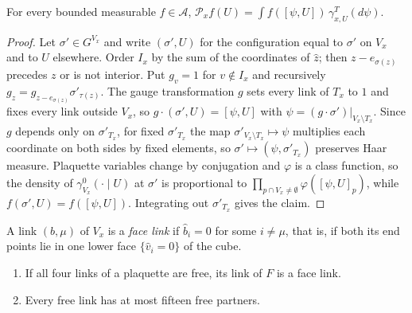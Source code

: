 \begin{lemma}\label{lem:cubegauge}
For every bounded measurable $f\in\mathcal A$,
$\mathcal P_xf(U)=\int f([\psi,U])\,\gamma^T_{x,U}(d\psi)$.
\end{lemma}

\begin{proof}
Let $\sigma'\in G^{V_x}$ and write $(\sigma',U)$ for the configuration equal to
$\sigma'$ on $V_x$ and to $U$ elsewhere. Order $I_x$ by the sum of the
coordinates of $\hat z$; then $z-e_{\sigma(z)}$ precedes $z$ or is not
interior. Put $g_v=1$ for $v\notin I_x$ and recursively $g_z=g_{z-e_{\sigma(z)}}
\sigma'_{\tau(z)}$. The gauge transformation $g$ sets every link of $T_x$ to $1$
and fixes every link outside $V_x$, so $g\cdot(\sigma',U)=[\psi,U]$ with
$\psi=(g\cdot\sigma')|_{V_x\setminus T_x}$. Since $g$ depends only on
$\sigma'_{T_x}$, for fixed $\sigma'_{T_x}$ the map $\sigma'_{V_x\setminus T_x}
\mapsto\psi$ multiplies each coordinate on both sides by fixed elements, so
$\sigma'\mapsto(\psi,\sigma'_{T_x})$ preserves Haar measure. Plaquette variables
change by conjugation and $\varphi$ is a class function, so the density of
$\gamma^0_{V_x}(\cdot\mid U)$ at $\sigma'$ is proportional to
$\prod_{p\cap V_x\ne\emptyset}\varphi([\psi,U]_p)$, while $f(\sigma',U)=
f([\psi,U])$. Integrating out $\sigma'_{T_x}$ gives the claim.
\end{proof}

A link $(b,\mu)$ of $V_x$ is a \emph{face link} if $\hat b_i=0$ for some
$i\ne\mu$, that is, if both its end points lie in one lower face
$\{\hat v_i=0\}$ of the cube.

\begin{lemma}\label{lem:fifteen}
\begin{enumerate}[label=\textup{(\roman*)},leftmargin=*]
\item If all four links of a plaquette are free, its link of $F$ is a face
link.
\item Every free link has at most fifteen free partners.
\end{enumerate}
\end{lemma}

